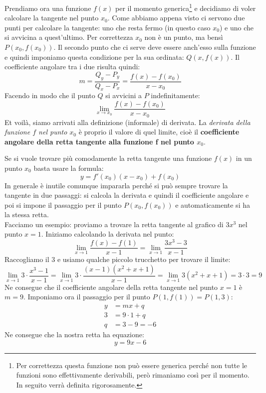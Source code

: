 Prendiamo ora una funzione $f(x)$ per il momento generica\footnote{Per correttezza questa funzione non può essere generica perché non tutte le funzioni sono effettivamente derivabili, però rimaniamo così per il momento. In seguito verrà definita rigorosamente.} e decidiamo di voler calcolare la tangente nel punto $x_0$. Come abbiamo appena visto ci servono due punti per calcolare la tangente: uno che resta fermo (in questo caso $x_0$) e uno che si avvicina a quest'ultimo. Per correttezza $x_0$ non è un punto, ma bensì $P(x_0, f(x_0))$. Il secondo punto che ci serve deve essere anch'esso sulla funzione e quindi imponiamo questa condizione per la sua ordinata: $Q(x, f(x))$. Il coefficiente angolare tra i due risulta quindi:
\begin{equation*}
	m = \dfrac{Q_y - P_y}{Q_x - P_x} = \dfrac{f(x) - f(x_0)}{x-x_0}
\end{equation*}
Facendo in modo che il punto $Q$ si avvicini a $P$ indefinitamente:
\begin{equation*}
	\lim_{x \to x_0} \dfrac{f(x) - f(x_0)}{x-x_0}
\end{equation*}
Et voilà, siamo arrivati alla definizione (informale) di derivata. La \textit{derivata della funzione $f$ nel punto $x_0$} è proprio il valore di quel limite, cioè il \textbf{coefficiente angolare della retta tangente alla funzione f nel punto $x_0$}. 

Se si vuole trovare più comodamente la retta tangente una funzione $f(x)$ in un punto $x_0$ basta usare la formula:
\begin{equation*}
	y = f'(x_0) (x - x_0) + f(x_0)
\end{equation*}
In generale è inutile comunque impararla perché si può sempre trovare la tangente in due passaggi: si calcola la derivata e quindi il coefficiente angolare e poi si impone il passaggio per il punto $P(x_0, f(x_0))$ e automaticamente si ha la stessa retta.\\

Facciamo un esempio: proviamo a trovare la retta tangente al grafico di $3x^3$ nel punto $x = 1$. Iniziamo calcolando la derivata nel punto:
\begin{equation*}
	\lim_{x \to 1} \dfrac{f(x) - f(1)}{x - 1} = \lim_{x \to 1} \dfrac{3x^3 - 3}{x - 1}
\end{equation*}
Raccogliamo il $3$ e usiamo qualche piccolo trucchetto per trovare il limite:
\begin{equation*}
	\lim_{x \to 1} 3 \cdot \dfrac{x^3 - 1}{x - 1} = \lim_{x \to 1} 3 \cdot \dfrac{(x - 1)(x^2 + x + 1)}{x - 1} = \lim_{x \to 1} 3(x^2 + x + 1) = 3 \cdot 3 = 9
\end{equation*}
Ne consegue che il coefficiente angolare della retta tangente nel punto $x = 1$ è $m = 9$. Imponiamo ora il passaggio per il punto $P(1, f(1)) = P(1, 3)$:
\begin{align*}
	y &= mx + q\\
	3 &= 9 \cdot 1 + q\\
	q &= 3 - 9 = -6
\end{align*}
Ne consegue che la nostra retta ha equazione:
\begin{equation*}
	y = 9x - 6
\end{equation*}


